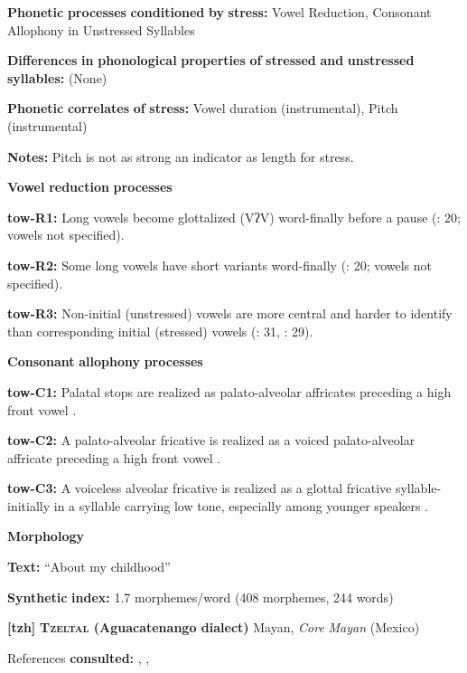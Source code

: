 \textbf{Phonetic} \textbf{processes} \textbf{conditioned} \textbf{by} \textbf{stress:} Vowel Reduction, Consonant Allophony in Unstressed Syllables

\textbf{Differences} \textbf{in} \textbf{phonological} \textbf{properties} \textbf{of} \textbf{stressed} \textbf{and} \textbf{unstressed} \textbf{syllables:} (None)

\textbf{Phonetic} \textbf{correlates} \textbf{of} \textbf{stress:} Vowel duration (instrumental), Pitch (instrumental)

\textbf{Notes:} Pitch is not as strong an indicator as length for stress.

\textbf{Vowel} \textbf{reduction} \textbf{processes}

\textbf{tow-R1:} Long vowels become glottalized (VʔV) word-finally before a pause (\citealt{Yumitani1998}: 20; vowels not specified).

\textbf{tow-R2:} Some long vowels have short variants word-finally (\citealt{Yumitani1998}: 20; vowels not specified).

\textbf{tow-R3:} Non-initial (unstressed) vowels are more central and harder to identify than corresponding initial (stressed) vowels (\citealt{Yumitani1998}: 31, \citealt{Bell1993}: 29).

\textbf{Consonant} \textbf{allophony} \textbf{processes}

\textbf{tow-C1:} Palatal stops are realized as palato-alveolar affricates preceding a high front vowel \citep[13]{Yumitani1998}.

\textbf{tow-C2:} A palato-alveolar fricative is realized as a voiced palato-alveolar affricate preceding a high front vowel \citep[13]{Yumitani1998}.

\textbf{tow-C3:} A voiceless alveolar fricative is realized as a glottal fricative syllable-initially in a syllable carrying low tone, especially among younger speakers \citep[13]{Yumitani1998}.

\textbf{Morphology}

\textbf{Text:} “About my childhood” \citep[248-250]{Yumitani1998}

\textbf{Synthetic} \textbf{index:} 1.7 morphemes/word (408 morphemes, 244 words)

\textbf{[tzh]}   \textbf{\textsc{Tzeltal} \textbf{(Aguacatenango} \textbf{dialect)}}  Mayan, \textit{Core} \textit{Mayan} (Mexico)

References \textbf{consulted:} \citet{Kaufman1971}, \citet{Polian2006}, \citet{Smith2007}

